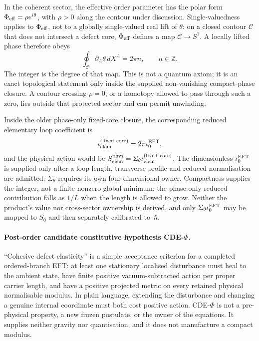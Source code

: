 \documentclass[11pt,a4paper]{article}
\begin{document}
In the coherent sector, the effective order parameter has the polar form
$\Phi_{\rm eff}=\rho e^{i\theta}$, with $\rho>0$ along the contour under
discussion.  Single-valuedness applies to $\Phi_{\rm eff}$, not to a globally
single-valued real lift of $\theta$: on a closed contour $\mathcal C$ that
does not intersect a defect core, $\Phi_{\rm eff}$ defines a map
$\mathcal C\to S^1$.  A locally lifted phase therefore obeys
\begin{equation}
  \oint_{\mathcal{C}} \partial_A\theta\,dX^A = 2\pi n,
  \qquad n \in \mathbb{Z}.
  \label{eq:pop_winding}
\end{equation}
The integer is the degree of that map.  This is not a quantum axiom; it is an
exact topological statement only inside the supplied non-vanishing
compact-phase closure.  A contour crossing $\rho=0$, or a homotopy allowed
to pass through such a zero, lies outside that protected sector and can
permit unwinding.

Inside the older phase-only fixed-core closure, the corresponding reduced
elementary loop coefficient is
\begin{equation}
  \iota_{\rm elem}^{\rm(fixed\ core)}
  =2\pi\iota_0^{\rm EFT},
  \label{eq:pop_Sloop}
\end{equation}
and the physical action would be
$S_{\rm elem}^{\rm phys}=\Sigma_\theta
\iota_{\rm elem}^{\rm(fixed\ core)}$.  The dimensionless
$\iota_0^{\rm EFT}$ is supplied only after a loop length, transverse profile
and reduced normalisation are admitted; $\Sigma_\theta$ requires its own
four-dimensional owner.  Compactness supplies the integer, not a finite
nonzero global minimum: the phase-only reduced contribution falls as $1/L$
when the length is allowed to grow.  Neither the product's value nor
cross-sector ownership is derived, and only
$\Sigma_\theta\iota_0^{\rm EFT}$ may be mapped to $S_0$ and then separately
calibrated to~$\hbar$.

\paragraph{Post-order candidate constitutive hypothesis CDE-$\Phi$.}
``Cohesive defect elasticity'' is a simple acceptance criterion for a
completed ordered-branch EFT: at least one stationary localised disturbance
must heal to the ambient state, have finite positive vacuum-subtracted
action per proper carrier length, and have a positive projected metric on
every retained physical normalisable modulus.  In plain language, extending
the disturbance and changing a genuine internal coordinate must both cost
positive action.  CDE-$\Phi$ is not a pre-physical property, a new frozen
postulate, or the owner of the equations.  It supplies neither gravity nor
quantisation, and it does not manufacture a compact modulus.
\end{document}
